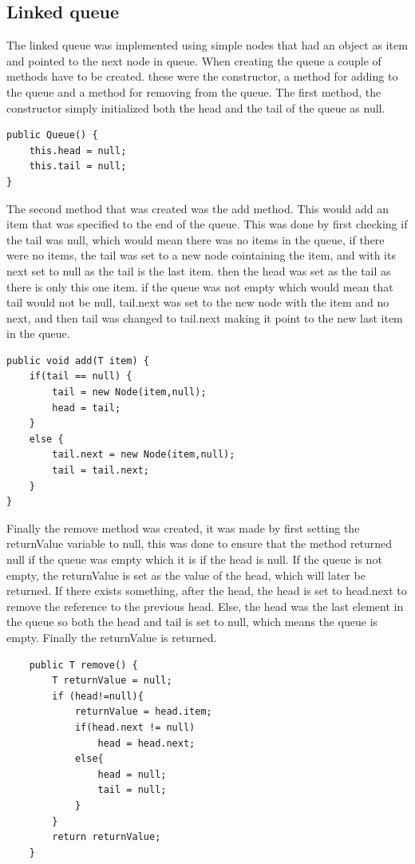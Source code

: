 \documentclass[a4paper,11pt]{article}
\begin{document}
\subsection*{Linked queue}
The linked queue was implemented using simple nodes that had an object as item and pointed to the next node in queue. When 
creating the queue a couple of methods have to be created. these were the constructor, a method for adding to the queue and a method for removing from the queue. The first method, the constructor simply initialized both the head and the tail of the queue as null. 
\begin{verbatim}
public Queue() {
    this.head = null;
    this.tail = null;
}
\end{verbatim} 
The second method that was created was the add method. This would add an item that was specified to the end of the queue. This was done by first checking if the tail was null, which would mean there was no items in the queue, if there were no items, the tail was set to a new node cointaining the item, and with its next set to null as the tail 
is the last item. then the head was set as the tail as there is only this one item. if the queue was not empty which would mean that tail would not be null, tail.next was set to the new node with the item and no next, and then tail was changed to tail.next making it point to the new last item in the queue.
\begin{verbatim}
public void add(T item) {
    if(tail == null) {
        tail = new Node(item,null);
        head = tail;
    }
    else {
        tail.next = new Node(item,null);
        tail = tail.next;
    }
}
\end{verbatim}
Finally the remove method was created, it was made by first setting the returnValue variable to null, this was done to ensure that the method returned null if the queue was empty which it is if the head is null. 
If the queue is not empty, the returnValue is set as the value of the head, which will later be returned. If there exists something, after the head, the head is set to head.next to remove the reference to the previous head. Else, the head was the last element in the queue 
so both the head and tail is set to null, which means the queue is empty. Finally the returnValue is returned.
\begin{verbatim}
    public T remove() {
        T returnValue = null;
        if (head!=null){
            returnValue = head.item;
            if(head.next != null) 
                head = head.next;
            else{
                head = null;
                tail = null;
            }
        }
        return returnValue;
    }
\end{verbatim} 
\end{document}

